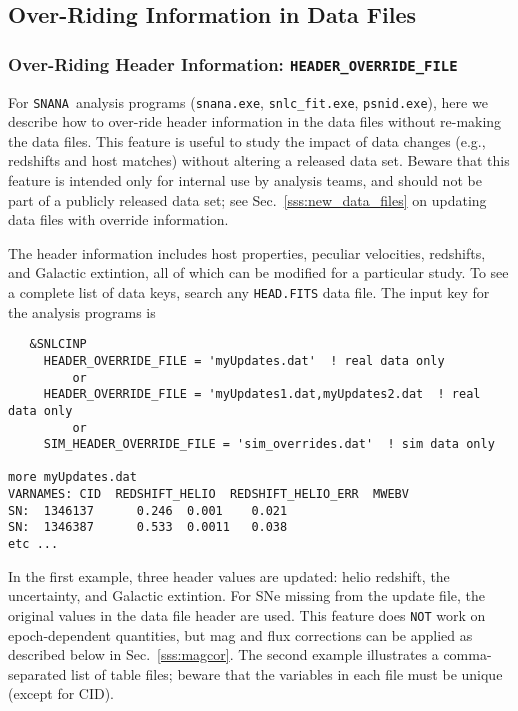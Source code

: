 \documentclass[12pt]{article}
\newcommand{\snana}{{\tt SNANA}}
\begin{document}
\clearpage
\subsection{Over-Riding Information in Data Files}
\label{subsec:data_override}


\subsubsection{Over-Riding Header Information: {\tt HEADER\_OVERRIDE\_FILE} }
\label{sss:header_override}

For \snana\ analysis programs 
({\tt snana.exe}, {\tt snlc\_fit.exe}, {\tt psnid.exe}),
here we describe how to over-ride header information in the
data files without re-making the data files.
This feature is useful to study the impact of data changes
(e.g., redshifts and host matches) without altering a released
data set. Beware that this feature is intended only for internal 
use by analysis teams,
and should not be part of a publicly released data set;
see Sec.~\ref{sss:new_data_files} on updating data files with 
override information.

The header information includes host properties, peculiar
velocities, redshifts, and Galactic extintion, all of which
can be modified for a particular study. 
To see a complete list of data keys, search any {\tt *HEAD.FITS} data file.
The input key for the analysis programs is
\begin{verbatim}
   &SNLCINP
     HEADER_OVERRIDE_FILE = 'myUpdates.dat'  ! real data only
         or
     HEADER_OVERRIDE_FILE = 'myUpdates1.dat,myUpdates2.dat  ! real data only
         or
     SIM_HEADER_OVERRIDE_FILE = 'sim_overrides.dat'  ! sim data only

more myUpdates.dat
VARNAMES: CID  REDSHIFT_HELIO  REDSHIFT_HELIO_ERR  MWEBV
SN:  1346137      0.246  0.001    0.021
SN:  1346387      0.533  0.0011   0.038
etc ...
\end{verbatim}
%

In the first example, three header values are updated:
helio redshift, the uncertainty, and Galactic extintion.
For SNe missing from the update file, the original values in the 
data file header are used. This feature does {\tt NOT} work
on epoch-dependent quantities, but mag and flux corrections can
be applied as described below in Sec.~\ref{sss:magcor}.
The second example illustrates a comma-separated list of table files;
beware that the variables in each file must be unique (except for CID).
\end{document}
